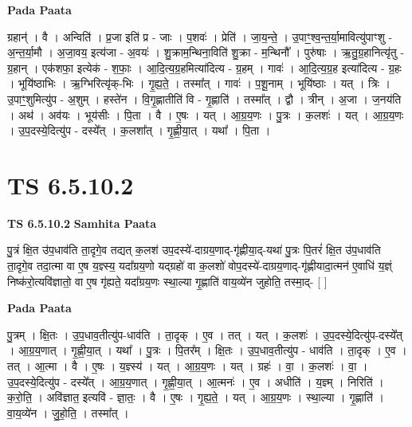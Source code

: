 \documentclass[17pt]{extarticle}
\begin{document}
\textbf{Pada Paata} \newline

ग्रहान्॑ । वै । अन्विति॑ । प्र॒जा इति॑ प्र - जाः । प॒शवः॑ । प्रेति॑ । जा॒य॒न्ते॒ । उ॒पाꣳ॒॒श्व॒न्त॒र्या॒मावित्यु॑पाꣳशु - अ॒न्त॒र्या॒मौ । अ॒जा॒वय॒ इत्य॑जा - अ॒वयः॑ । शु॒क्राम॒न्थिना॒विति॑ शु॒क्रा - म॒न्थिनौ᳚ । पुरु॑षाः । ऋ॒तु॒ग्र॒हानित्यृ॑तु - ग्र॒हान् । एक॑शफा॒ इत्येक॑ - श॒फाः॒ । आ॒दि॒त्य॒ग्र॒हमित्या॑दित्य - ग्र॒हम् । गावः॑ । आ॒दि॒त्य॒ग्र॒ह इत्या॑दित्य - ग्र॒हः । भूयि॑ष्ठाभिः । ऋ॒ग्भिरित्यृ॑क्-भिः । गृ॒ह्य॒ते॒ । तस्मा᳚त् । गावः॑ । प॒शू॒नाम् । भूयि॑ष्ठाः । यत् । त्रिः । उ॒पाꣳ॒॒शुमित्यु॑प - अ॒शुम् । हस्ते॑न । वि॒गृ॒ह्णातीति॑ वि - गृ॒ह्णाति॑ । तस्मा᳚त् । द्वौ । त्रीन् । अ॒जा । ज॒नय॑ति । अथ॑ । अव॑यः । भूय॑सीः । पि॒ता । वै । ए॒षः । यत् । आ॒ग्र॒य॒णः । पु॒त्रः । क॒लशः॑ । यत् । आ॒ग्र॒य॒णः । उ॒प॒दस्ये॒दित्यु॑प - दस्ये᳚त् । क॒लशा᳚त् । गृ॒ह्णी॒या॒त् । यथा᳚ । पि॒ता ।  \newline





\section{ TS 6.5.10.2 }

\textbf{TS 6.5.10.2 } \newline
\textbf{Samhita Paata} \newline

पु॒त्रं क्षि॒त उ॑प॒धाव॑ति ता॒दृगे॒व तद्यत् क॒लश॑ उप॒दस्ये॑-दाग्रय॒णाद्-गृ॑ह्णीया॒द्-यथा॑ पु॒त्रः पि॒तरं॑ क्षि॒त उ॑प॒धाव॑ति ता॒दृगे॒व तदा॒त्मा वा ए॒ष य॒ज्ञ्स्य॒ यदा᳚ग्रय॒णो यद्ग्रहो॑ वा क॒लशो॑ वोप॒दस्ये॑-दाग्रय॒णाद्-गृ॑ह्णीयादा॒त्मन॑ ए॒वाधि॑ य॒ज्ञ्ं निष्क॑रो॒त्यवि॑ज्ञातो॒ वा ए॒ष गृ॑ह्यते॒ यदा᳚ग्रय॒णः स्था॒ल्या गृ॒ह्णाति॑ वाय॒व्ये॑न जुहोति॒ तस्मा॒द्- [  ] \newline

\textbf{Pada Paata} \newline

पु॒त्रम् । क्षि॒तः । उ॒प॒धाव॒तीत्यु॑प-धाव॑ति । ता॒दृक् । ए॒व । तत् । यत् । क॒लशः॑ । उ॒प॒दस्ये॒दित्यु॑प-दस्ये᳚त् । आ॒ग्र॒य॒णात् । गृ॒ह्णी॒या॒त् । यथा᳚ । पु॒त्रः । पि॒तर᳚म् । क्षि॒तः । उ॒प॒धाव॒तीत्यु॑प - धाव॑ति । ता॒दृक् । ए॒व । तत् । आ॒त्मा । वै । ए॒षः । य॒ज्ञ्स्य॑ । यत् । आ॒ग्र॒य॒णः । यत् । ग्रहः॑ । वा॒ । क॒लशः॑ । वा॒ । उ॒प॒दस्ये॒दित्यु॑प - दस्ये᳚त् । आ॒ग्र॒य॒णात् । गृ॒ह्णी॒या॒त् । आ॒त्मनः॑ । ए॒व । अधीति॑ । य॒ज्ञ्म् । निरिति॑ । क॒रो॒ति॒ । अवि॑ज्ञात॒ इत्यवि॑ - ज्ञा॒तः॒ । वै । ए॒षः । गृ॒ह्य॒ते॒ । यत् । आ॒ग्र॒य॒णः । स्था॒ल्या । गृ॒ह्णाति॑ । वा॒य॒व्ये॑न । जु॒हो॒ति॒ । तस्मा᳚त् ।  \newline
\end{document}

